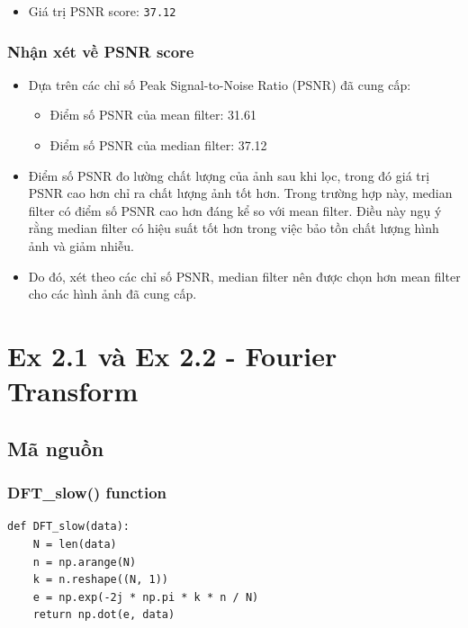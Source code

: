 \documentclass{article}
\begin{document}
\begin{itemize}
    \item Giá trị PSNR score: \lstinline{37.12}
\end{itemize}

\subsubsection{Nhận xét về PSNR score}

\begin{itemize}
    \item Dựa trên các chỉ số Peak Signal-to-Noise Ratio (PSNR) đã cung cấp:
    \begin{itemize}
        \item Điểm số PSNR của mean filter: 31.61
        \item Điểm số PSNR của median filter: 37.12
    \end{itemize}
    
    \item Điểm số PSNR đo lường chất lượng của ảnh sau khi lọc, trong đó giá trị PSNR cao hơn chỉ ra chất lượng ảnh tốt hơn. Trong trường hợp này, median filter có điểm số PSNR cao hơn đáng kể so với mean filter. Điều này ngụ ý rằng median filter có hiệu suất tốt hơn trong việc bảo tồn chất lượng hình ảnh và giảm nhiễu.
    \item Do đó, xét theo các chỉ số PSNR, median filter nên được chọn hơn mean filter cho các hình ảnh đã cung cấp.
    
\end{itemize}



\section{Ex 2.1 và Ex 2.2 - Fourier Transform}
\subsection{Mã nguồn}

\subsubsection{DFT\_slow() function}
\begin{lstlisting}[caption={Code of DFT\_slow() function}]
def DFT_slow(data):
    N = len(data)
    n = np.arange(N)
    k = n.reshape((N, 1))
    e = np.exp(-2j * np.pi * k * n / N)
    return np.dot(e, data)
\end{lstlisting}
\end{document}

